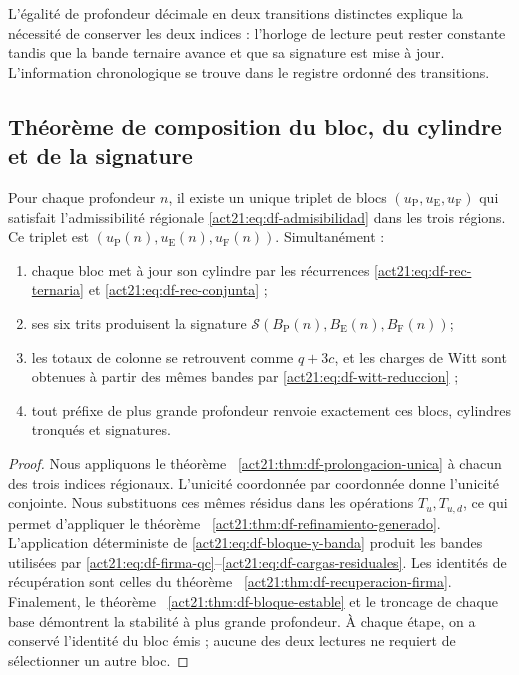 L'égalité de profondeur décimale en deux transitions distinctes explique la nécessité de conserver les deux indices : l'horloge de lecture peut rester constante tandis que la bande ternaire avance et que sa signature est mise à jour. L'information chronologique se trouve dans le registre ordonné des transitions.

\subsection{Théorème de composition du bloc, du cylindre et de la signature}

\begin{theorem}
\label{act21:thm:df-composicion-conjunta}
Pour chaque profondeur \(n\), il existe un unique triplet de blocs
\((u_{\mathrm P},u_{\mathrm E},u_{\mathrm F})\) qui satisfait
l'admissibilité régionale \eqref{act21:eq:df-admisibilidad} dans les trois régions.
Ce triplet est \((u_{\mathrm P}(n),u_{\mathrm E}(n),u_{\mathrm F}(n))\).
Simultanément :
\begin{enumerate}
\item chaque bloc met à jour son cylindre par les récurrences
\eqref{act21:eq:df-rec-ternaria} et \eqref{act21:eq:df-rec-conjunta} ;
\item ses six trits produisent la signature
\(\mathcal S(B_{\mathrm P}(n),B_{\mathrm E}(n),B_{\mathrm F}(n))\);
\item les totaux de colonne se retrouvent comme \(q+3c\), et les charges de Witt sont obtenues à partir des mêmes bandes par
\eqref{act21:eq:df-witt-reduccion} ;
\item tout préfixe de plus grande profondeur renvoie exactement ces
blocs, cylindres tronqués et signatures.
\end{enumerate}
\end{theorem}

\begin{proof}
Nous appliquons le théorème ~\ref{act21:thm:df-prolongacion-unica} à chacun des trois
indices régionaux. L'unicité coordonnée par coordonnée donne l'unicité
conjointe. Nous substituons ces mêmes résidus dans les opérations
\(T_u,T_{u,d}\), ce qui permet d'appliquer le
théorème ~\ref{act21:thm:df-refinamiento-generado}. L'application déterministe de
\eqref{act21:eq:df-bloque-y-banda} produit les bandes utilisées par
\eqref{act21:eq:df-firma-qc}--\eqref{act21:eq:df-cargas-residuales}. Les identités
de récupération sont celles du théorème ~\ref{act21:thm:df-recuperacion-firma}.
Finalement, le théorème ~\ref{act21:thm:df-bloque-estable} et le troncage de
chaque base démontrent la stabilité à plus grande profondeur. À chaque étape, on a conservé l'identité du bloc émis ; aucune des deux
lectures ne requiert de sélectionner un autre bloc.
\end{proof}

